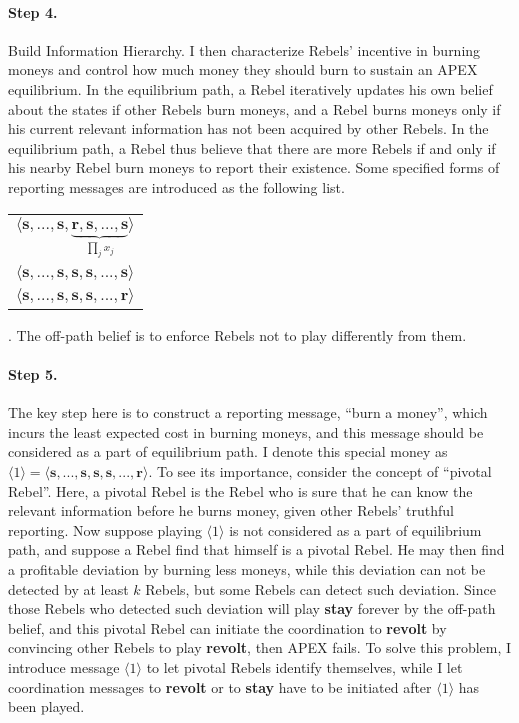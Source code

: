\documentclass[12pt,letter]{article}
\theoremstyle{definition}
\theoremstyle{remark}
\theoremstyle{claim}
\begin{document}
\paragraph{Step 4.} Build {Information Hierarchy}. I then characterize Rebels' incentive in burning moneys and control how much money they should burn to sustain an APEX equilibrium. In the equilibrium path, a Rebel iteratively updates his own belief about the states if other Rebels burn moneys, and a Rebel burns moneys only if his current relevant information has not been acquired by other Rebels. In the equilibrium path, a Rebel thus believe that there are more Rebels if and only if his nearby Rebel burn moneys to report their existence. Some specified forms of reporting messages are introduced as the following list. 
\begin{table}[h]

\begin{center}

\begin{tabular}{l}

$\langle \textbf{s},...,\textbf{s},\underbrace{\textbf{r},\textbf{s},...,\textbf{s}}_{\prod_{j}x_j}\rangle$  \\
$\langle \textbf{s},...,\textbf{s},{\textbf{s},\textbf{s},...,\textbf{s}}\rangle$	  \\
$\langle \textbf{s},...,\textbf{s},{\textbf{s},\textbf{s},...,\textbf{r}}\rangle$								
\end{tabular}
\end{center}
\end{table}
. The off-path belief is to enforce Rebels not to play differently from them.

\paragraph{Step 5.}
The key step here is to construct a reporting message, ``burn a money'', which incurs the least expected cost in burning moneys, and this message should be considered as a part of equilibrium path. I denote this special money as $\langle 1 \rangle=\langle \textbf{s},...,\textbf{s},{\textbf{s},\textbf{s},...,\textbf{r}}\rangle$. To see its importance, consider the concept of ``pivotal Rebel''. Here, a pivotal Rebel is the Rebel who is sure that he can know the relevant information before he burns money, given other Rebels' truthful reporting. Now suppose playing $\langle 1 \rangle$ is not considered as a part of equilibrium path, and suppose a Rebel find that himself is a pivotal Rebel. He may then find a profitable deviation by burning less moneys, while this deviation can not be detected by at least $k$ Rebels, but some Rebels can detect such deviation. Since those Rebels who detected such deviation will play \textbf{stay} forever by the off-path belief, and this pivotal Rebel can initiate the coordination to \textbf{revolt} by convincing other Rebels to play \textbf{revolt}, then APEX fails. To solve this problem, I introduce message $\langle 1 \rangle$ to let pivotal Rebels identify themselves, while I let coordination messages to \textbf{revolt} or to \textbf{stay} have to be initiated after $\langle 1 \rangle$ has been played.
\end{document}
